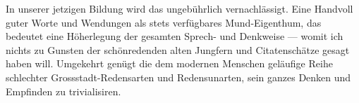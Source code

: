 In unserer jetzigen Bildung wird das  ungebührlich vernachlässigt. Eine Handvoll guter Worte und Wendungen als stets verfügbares Mund-Eigenthum, das bedeutet eine Höherlegung der gesamten Sprech- und Denkweise — womit ich nichts zu Gunsten der schönredenden alten Jungfern und Citatenschätze gesagt haben will. Umgekehrt genügt die dem modernen Menschen geläufige Reihe schlechter Grossstadt-Redensarten und Redensunarten, sein ganzes Denken und Empfinden zu trivialisiren.
\par

